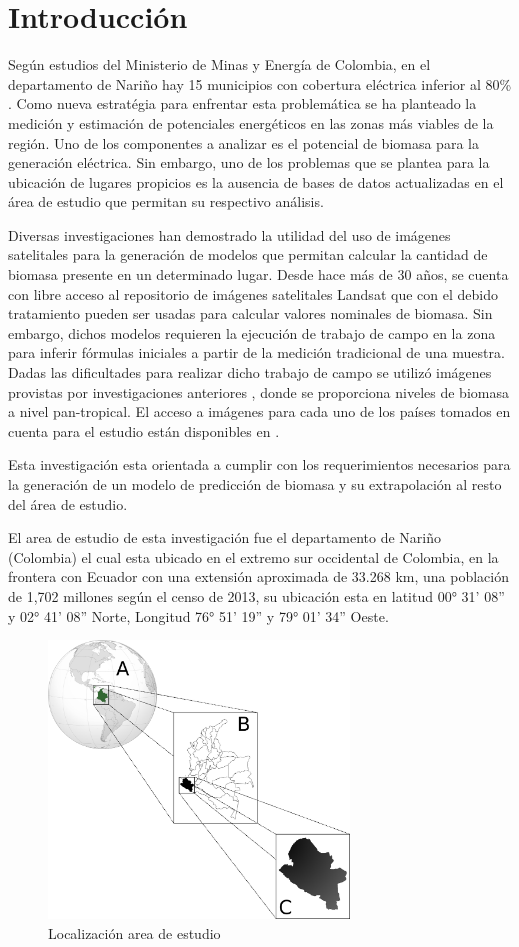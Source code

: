\section{Introducción}

\IEEEPARstart Según estudios del Ministerio de Minas y Energía de Colombia, en el departamento de Nariño hay 15 municipios con cobertura eléctrica inferior al 80\% \cite{ministerio_de_minas_y_energia_plan_2008}. Como nueva estratégia para enfrentar esta problemática se ha planteado la medición y estimación de potenciales energéticos en las zonas más viables de la región. Uno de los componentes a analizar es el potencial de biomasa para la generación eléctrica. Sin embargo, uno de los problemas que se plantea para la ubicación de lugares propicios es la ausencia de bases de datos actualizadas en el área de estudio que permitan su respectivo análisis.

Diversas investigaciones han demostrado la utilidad del uso de imágenes satelitales para la generación de modelos que permitan calcular la cantidad de biomasa presente en un determinado lugar. Desde hace más de 30 años, se cuenta con libre acceso al repositorio de imágenes satelitales Landsat \cite{landsat} que con el debido tratamiento pueden ser usadas para calcular valores nominales de biomasa. Sin embargo, dichos modelos requieren la ejecución de trabajo de campo en la zona para inferir fórmulas iniciales a partir de la medición tradicional de una muestra. Dadas las dificultades para realizar dicho trabajo de campo se utilizó imágenes provistas por investigaciones anteriores \cite{baccini2008afirst}, \cite{baccini_estimated_2012} donde se proporciona niveles de biomasa a nivel pan-tropical.  El acceso a imágenes para cada uno de los países tomados en cuenta para el estudio están disponibles en \cite{WHRC}.

Esta investigación esta orientada a cumplir con los requerimientos necesarios para la generación de un modelo de predicción de biomasa y su extrapolación al resto del área de estudio.


El area de estudio de esta investigación fue el departamento de Nariño (Colombia)
el cual esta ubicado en el extremo sur occidental de Colombia, en la frontera con 
Ecuador con una extensión aproximada de 33.268 km, una población de 1,702 millones según
el censo de 2013, su ubicación 
esta en latitud 00° 31' 08'' y 02° 41' 08'' Norte, Longitud 76° 51' 19'' y 79° 01' 34'' Oeste.

\begin{figure}
  \centering
  \includegraphics[width = 8cm]{locationNarino.png}
  \caption{Localización area de estudio}
  \label{fig:locationNarino}
\end{figure}
